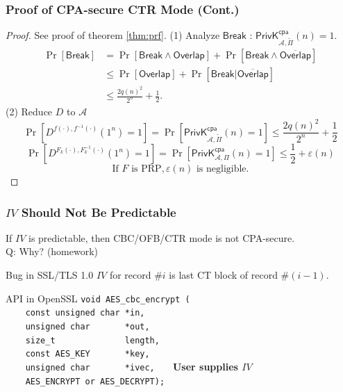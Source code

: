 \begin{frame}\frametitle{Proof of CPA-secure CTR Mode (Cont.)}
\begin{proof}
See proof of theorem \ref{thm:prf}.
(1) Analyze $\mathsf{Break}$ : $\mathsf{PrivK}_{\mathcal{A},\tilde{\Pi}}^{\mathsf{cpa}}(n)=1$.
\[
\begin{split}
	\Pr[\mathsf{Break}] & =\Pr[\mathsf{Break} \land \mathsf{Overlap}] + \Pr[\mathsf{Break} \land \overline{\mathsf{Overlap}}] \\
	&\le \Pr[\mathsf{Overlap}] + \Pr[\mathsf{Break} | \overline{\mathsf{Overlap}}] \\
	&\le \frac{2q(n)^2}{2^n} + \frac{1}{2}.
\end{split}
\]
(2) Reduce $D$ to $\mathcal{A}$
\[ \Pr[D^{f(\cdot),f^{-1}(\cdot)}(1^n)=1]=\Pr[\mathsf{PrivK}_{\mathcal{A},\tilde{\Pi}}^{\mathsf{cpa}}(n)=1] \le \frac{2q(n)^2}{2^n} + \frac{1}{2}
\]
\[\Pr[D^{F_k(\cdot),F_k^{-1}(\cdot)}(1^n)=1]=\Pr[\mathsf{PrivK}_{\mathcal{A},\Pi}^{\mathsf{cpa}}(n)=1] \le \frac{1}{2} + \varepsilon(n)
\]
\[ \text{If } F \text{ is PRP}, \varepsilon(n) \text{ is negligible.}
\]
\end{proof}
\end{frame}
\begin{frame}[fragile]\frametitle{$IV$ Should Not Be Predictable}
If $IV$ is predictable, then CBC/OFB/CTR mode is not CPA-secure.\\
\alert{Q: Why? (homework)}
\begin{exampleblock}{Bug in SSL/TLS 1.0}
$IV$ for record $\#i$ is last CT block of record $\#(i-1)$.
\end{exampleblock}
\begin{exampleblock}{API in OpenSSL}
\verb#void AES_cbc_encrypt (# \\
\verb#    const unsigned char *in,# \\
\verb#    unsigned char       *out,# \\
\verb#    size_t              length,# \\
\verb#    const AES_KEY       *key,# \\
\verb#    unsigned char       *ivec,   #  \alert{\textbf{User supplies $IV$}} \\
\verb#    AES_ENCRYPT or AES_DECRYPT);# \\
\end{exampleblock}
\end{frame}
